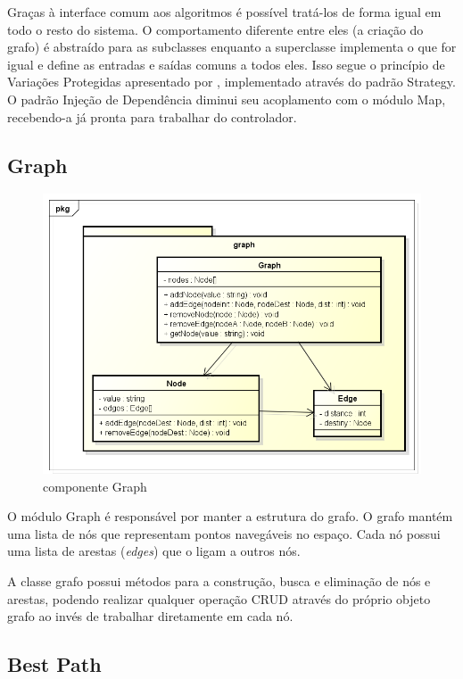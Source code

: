 Graças à interface comum aos algoritmos é possível tratá-los de forma igual em todo o resto do sistema. O comportamento diferente entre eles (a criação do grafo) é abstraído para as subclasses enquanto a superclasse implementa o que for igual e define as entradas e saídas comuns a todos eles. Isso segue o princípio de Variações Protegidas apresentado por \cite{Larman2005}, implementado através do padrão Strategy. O padrão Injeção de Dependência diminui seu acoplamento com o módulo Map, recebendo-a já pronta para trabalhar do controlador.

\subsection{Graph}

\begin{figure}[h]
	\centering
	\label{fig26}
		\includegraphics[keepaspectratio=true,scale=0.5]{figuras/pkggraph.png}
	\caption{componente Graph}
\end{figure}

O módulo Graph é responsável por manter a estrutura do grafo. O grafo mantém uma lista de nós que representam pontos navegáveis no espaço. Cada nó possui uma lista de arestas (\textit{edges}) que o ligam a outros nós.

A classe grafo possui métodos para a construção, busca e eliminação de nós e arestas, podendo realizar qualquer operação CRUD através do próprio objeto grafo ao invés de trabalhar diretamente em cada nó.

\subsection{Best Path}

